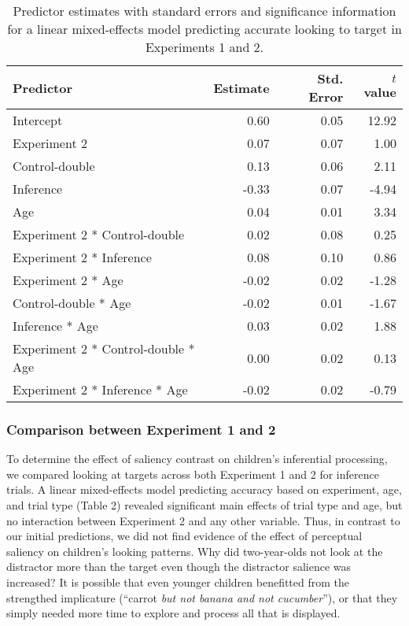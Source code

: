 \documentclass[a4paper,man,apacite,floatsintext]{apa6}
\begin{document}
\begin{table}[tb]
\centering
\begin{tabular}{lrrr}
 Predictor & Estimate & Std. Error & $t$ value \\ 
  \hline
Intercept & 0.60 & 0.05 & 12.92 \\ 
  Experiment 2 & 0.07 & 0.07 & 1.00 \\ 
  Control-double & 0.13 & 0.06 & 2.11 \\ 
  Inference & -0.33 & 0.07 & -4.94 \\ 
  Age & 0.04 & 0.01 & 3.34 \\ 
  Experiment 2 * Control-double & 0.02 & 0.08 & 0.25 \\ 
  Experiment 2 * Inference & 0.08 & 0.10 & 0.86 \\ 
  Experiment 2 * Age & -0.02 & 0.02 & -1.28 \\ 
  Control-double * Age & -0.02 & 0.01 & -1.67 \\ 
  Inference * Age & 0.03 & 0.02 & 1.88 \\ 
  Experiment 2 * Control-double * Age & 0.00 & 0.02 & 0.13 \\ 
  Experiment 2 * Inference * Age & -0.02 & 0.02 & -0.79 \\ 
   \hline
\end{tabular}
\caption{Predictor estimates with standard errors and significance information for a linear mixed-effects model predicting accurate looking to target in Experiments 1 and 2.} 
\label{tab:exp2_tab}
\end{table}

\subsubsection{Comparison between Experiment 1 and
2}\label{comparison-between-experiment-1-and-2}

To determine the effect of saliency contrast on children's inferential
processing, we compared looking at targets across both Experiment 1 and
2 for inference trials. A linear mixed-effects model predicting accuracy
based on experiment, age, and trial type (Table 2) revealed significant
main effects of trial type and age, but no interaction between
Experiment 2 and any other variable. Thus, in contrast to our initial
predictions, we did not find evidence of the effect of perceptual
saliency on children's looking patterns. Why did two-year-olds not look
at the distractor more than the target even though the distractor
salience was increased? It is possible that even younger children
benefitted from the strengthed implicature (``carrot \emph{but not
banana and not cucumber}''), or that they simply needed more time to
explore and process all that is displayed.
\end{document}
